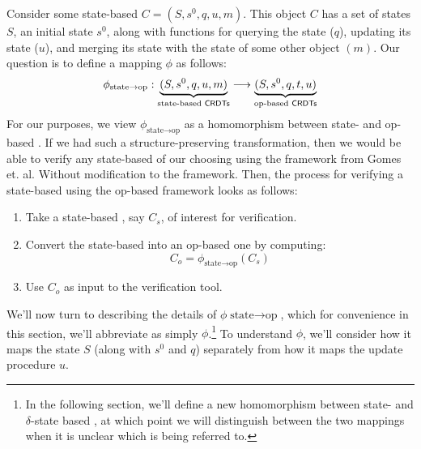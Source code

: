Consider some state-based \CRDT $C = (S, s^0, q, u, m)$. This object $C$ has a
set of states $S$, an initial state $s^0$, along with functions for querying the
state ($q$), updating its state ($u$), and merging its state with the state of
some other object $(m)$. Our question is to define a mapping $\phi$ as
follows:
\[
  \phi_{\text{state} \to \text{op}} :
    \underbrace{(S, s^0, q, u, m)}_{\text{state-based \textsf{CRDTs}}} \longrightarrow
    \underbrace{(S, s^0, q, t, u)}_{\text{op-based \textsf{CRDTs}}}
\]
For our purposes, we view $\phi_{\text{state} \to \text{op}}$ as a homomorphism
between state- and op-based \CRDTs. If we had such a structure-preserving
transformation, then we would be able to verify any state-based \CRDT of our
choosing using the framework from Gomes et. al. Without modification to the
framework. Then, the process for verifying a state-based \CRDT using the
op-based framework looks as follows:
\begin{enumerate}
  \item Take a state-based \CRDT, say $C_s$, of interest for verification.
  \item Convert the state-based \CRDT into an op-based one by computing:
    \[
      C_o = \phi_{\text{state} \to \text{op}}(C_s)
    \]
  \item Use $C_o$ as input to the verification tool.
\end{enumerate}

We'll now turn to describing the details of $\phi{\text{state} \to \text{op}}$,
which for convenience in this section, we'll abbreviate as simply
$\phi$.\footnote{In the following section, we'll define a new homomorphism
between state- and $\delta$-state based \CRDTs, at which point we will
distinguish between the two mappings when it is unclear which is being referred
to.} To understand $\phi$, we'll consider how it maps the state $S$ (along with
$s^0$ and $q$) separately from how it maps the update procedure $u$.

